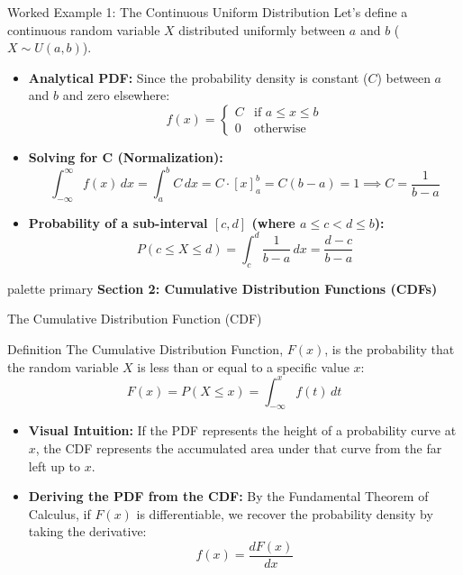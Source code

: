 \documentclass[9pt]{beamer}
\begin{document}
\begin{frame}{Worked Example 1: The Continuous Uniform Distribution}
  Let's define a continuous random variable $X$ distributed uniformly between $a$ and $b$ ($X \sim U(a, b)$).
  \begin{itemize}
    \item \textbf{Analytical PDF:} Since the probability density is constant ($C$) between $a$ and $b$ and zero elsewhere:
      $$f(x) = \begin{cases} C & \text{if } a \le x \le b \\ 0 & \text{otherwise} \end{cases}$$
    \item \textbf{Solving for C (Normalization):}
      $$\int_{-\infty}^{\infty} f(x) \, dx = \int_{a}^{b} C \, dx = C \cdot [x]_a^b = C(b - a) = 1 \implies C = \frac{1}{b - a}$$
    \item \textbf{Probability of a sub-interval $[c, d]$ (where $a \le c < d \le b$):}
      $$P(c \le X \le d) = \int_{c}^{d} \frac{1}{b - a} \, dx = \frac{d - c}{b - a}$$
  \end{itemize}
\end{frame}

\begin{frame}[plain]
  \vfill
  \centering
  \begin{beamercolorbox}[sep=8pt,center,shadow=true,rounded=true]{palette primary}
    \textbf{Section 2: Cumulative Distribution Functions (CDFs)}
  \end{beamercolorbox}
  \vfill
\end{frame}

\begin{frame}{The Cumulative Distribution Function (CDF)}
  \begin{block}{Definition}
    The Cumulative Distribution Function, $F(x)$, is the probability that the random variable $X$ is less than or equal to a specific value $x$:
    $$F(x) = P(X \le x) = \int_{-\infty}^{x} f(t) \, dt$$
  \end{block}
  \begin{itemize}
    \item \textbf{Visual Intuition:} If the PDF represents the height of a probability curve at $x$, the CDF represents the accumulated area under that curve from the far left up to $x$.
    \item \textbf{Deriving the PDF from the CDF:}
      By the Fundamental Theorem of Calculus, if $F(x)$ is differentiable, we recover the probability density by taking the derivative:
      $$f(x) = \frac{dF(x)}{dx}$$
  \end{itemize}
\end{frame}
\end{document}
